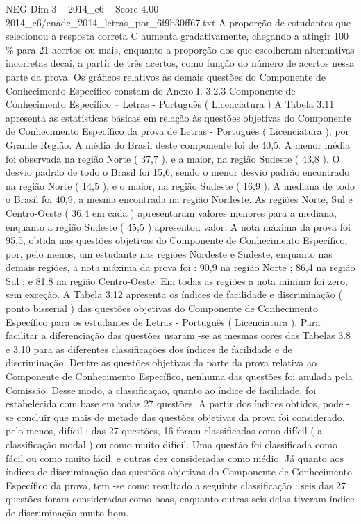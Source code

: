 \begin{textsample}{NEG Dim 3 – 2014\_c6 – Score 4.00 – 2014\_c6/enade\_2014\_letras\_por\_6f9b30ff67.txt}
A proporção de estudantes que selecionou a resposta correta C aumenta gradativamente, chegando a atingir 100 \% para 21 acertos ou mais, enquanto a proporção dos que escolheram alternativas incorretas decai, a partir de três acertos, como função do número de acertos nessa parte da prova.
Os gráficos relativos às demais questões do Componente de Conhecimento Específico constam do Anexo I. 3.2.3 Componente de Conhecimento Específico – Letras - Português ( Licenciatura ) A Tabela 3.11 apresenta as estatísticas básicas em relação às questões objetivas do Componente de Conhecimento Específico da prova de Letras - Português ( Licenciatura ), por Grande Região.
A média do Brasil deste componente foi de 40,5.
A menor média foi observada na região Norte ( 37,7 ), e a maior, na região Sudeste ( 43,8 ).
O desvio padrão de todo o Brasil foi 15,6, sendo o menor desvio padrão encontrado na região Norte ( 14,5 ), e o maior, na região Sudeste ( 16,9 ).
A mediana de todo o Brasil foi 40,9, a mesma encontrada na região Nordeste.
As regiões Norte, Sul e Centro-Oeste ( 36,4 em cada ) apresentaram valores menores para a mediana, enquanto a região Sudeste ( 45,5 ) apresentou valor.
A nota máxima da prova foi 95,5, obtida nas questões objetivas do Componente de Conhecimento Específico, por, pelo menos, um estudante nas regiões Nordeste e Sudeste, enquanto nas demais regiões, a nota máxima da prova foi : 90,9 na região Norte ; 86,4 na região Sul ; e 81,8 na região Centro-Oeste.
Em todas as regiões a nota mínima foi zero, sem exceção.
A Tabela 3.12 apresenta os índices de facilidade e discriminação ( ponto bisserial ) das questões objetivas do Componente de Conhecimento Específico para os estudantes de Letras - Português ( Licenciatura ).
Para facilitar a diferenciação das questões usaram -se as mesmas cores das Tabelas 3.8 e 3.10 para as diferentes classificações dos índices de facilidade e de discriminação.
Dentre as questões objetivas da parte da prova relativa ao Componente de Conhecimento Específico, nenhuma das questões foi anulada pela Comissão.
Desse modo, a classificação, quanto ao índice de facilidade, foi estabelecida com base em todas 27 questões.
A partir dos índices obtidos, pode -se concluir que mais de metade das questões objetivas da prova foi considerado, pelo menos, difícil : das 27 questões, 16 foram classificadas como difícil ( a classificação modal ) ou como muito difícil.
Uma questão foi classificada como fácil ou como muito fácil, e outras dez consideradas como médio.
Já quanto aos índices de discriminação das questões objetivas do Componente de Conhecimento Específico da prova, tem -se como resultado a seguinte classificação : seis das 27 questões foram consideradas como boas, enquanto outras seis delas tiveram índice de discriminação muito bom.

\end{textsample}
